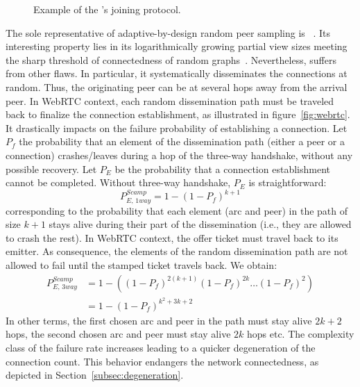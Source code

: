 \begin{figure*}
  \centering
  \hspace{8pt}
  \hspace{8pt}
  \caption{\label{fig:joiningexample}Example of the \SPRAY's joining
    protocol.}
\end{figure*}

The sole representative of adaptive-by-design random peer sampling is
\SCAMP~\cite{ganesh2001scamp,ganesh2003peer}. Its interesting property lies in
its logarithmically growing partial view sizes meeting the sharp threshold of
connectedness of random graphs~\cite{erdos1959random}. Nevertheless, \SCAMP
suffers from other flaws. In particular, it systematically disseminates the
connections at random. Thus, the originating peer can be at several hops away
from the arrival peer.  In WebRTC context, each random dissemination path must
be traveled back to finalize the connection establishment, as illustrated in
figure~\ref{fig:webrtc}. It drastically impacts on the \SCAMP failure
probability of establishing a connection.  Let $P_f$ the probability that an
element of the dissemination path (either a peer or a connection)
crashes/leaves during a hop of the three-way handshake, without any possible
recovery. Let $P_E$ be the probability that a connection establishment cannot
be completed. Without three-way handshake, $P_E$ is straightforward:
\begin{equation} P_{E,\,1way}^{Scamp}=1-(1- P_f)^{k+1} \end{equation}
corresponding to the probability that each element (arc and peer) in the path
of size $k+1$ stays alive during their part of the dissemination (i.e., they
are allowed to crash the rest). In WebRTC context, the offer ticket must travel
back to its emitter. As consequence, the elements of the random dissemination
path are not allowed to fail until the stamped ticket travels back. We obtain:
\begin{align} P_{E,\,3way}^{Scamp} &=1 - ((1-P_f)^{2(k+1)} (1-P_f)^{2k}
                                     \ldots (1-P_f)^2) \nonumber \\
                                   &=1-(1-P_f)^{k^2+3k+2}
\end{align}
In other terms, the first chosen arc and peer in the path must stay alive
$2k+2$ hops, the second chosen arc and peer must stay alive $2k$ hops etc.  The
complexity class of the \SCAMP failure rate increases leading to a quicker
degeneration of the connection count. This behavior endangers the network
connectedness, as depicted in Section~\ref{subsec:degeneration}.

